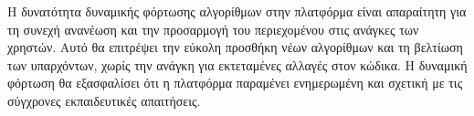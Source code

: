 Η δυνατότητα δυναμικής φόρτωσης αλγορίθμων στην πλατφόρμα είναι απαραίτητη για τη συνεχή ανανέωση και την προσαρμογή του περιεχομένου στις ανάγκες των χρηστών. Αυτό θα επιτρέψει την εύκολη προσθήκη νέων αλγορίθμων και τη βελτίωση των υπαρχόντων, χωρίς την ανάγκη για εκτεταμένες αλλαγές στον κώδικα. Η δυναμική φόρτωση θα εξασφαλίσει ότι η πλατφόρμα παραμένει ενημερωμένη και σχετική με τις σύγχρονες εκπαιδευτικές απαιτήσεις.

